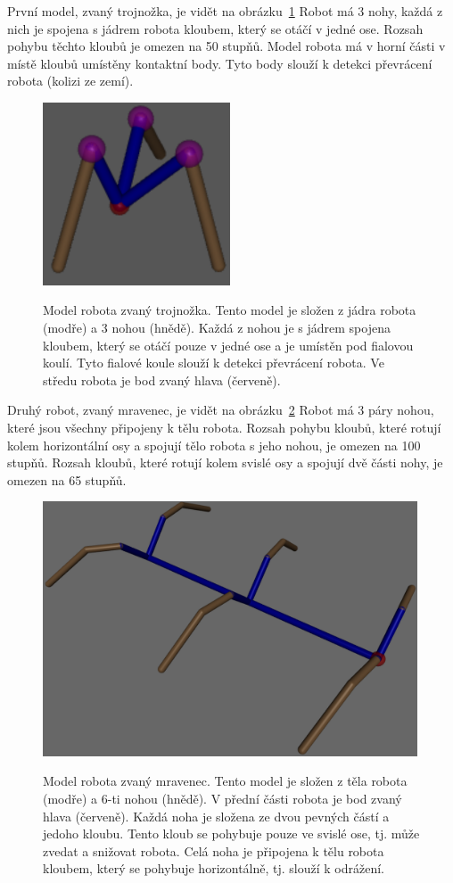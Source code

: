 První model, zvaný trojnožka, je vidět na obrázku~\ref{fig:trojnozka}
Robot má 3 nohy, každá z nich je spojena s jádrem robota kloubem, který se otáčí v jedné ose.
Rozsah pohybu těchto kloubů je omezen na 50 stupňů.
Model robota má v horní části v místě kloubů umístěny kontaktní body.
Tyto body slouží k detekci převrácení robota (kolizi ze zemí).

\begin{figure}[h]
    \centering
    {\includegraphics[width=15em]{obrazky/trojnozka_detail.png}}
    \caption{
    Model robota zvaný trojnožka.
    Tento model je složen z jádra robota (modře) a 3 nohou (hnědě).
    Každá z nohou je s jádrem spojena kloubem, který se otáčí pouze v jedné ose a je umístěn pod fialovou koulí.
    Tyto fialové koule slouží k detekci převrácení robota.
    Ve středu robota je bod zvaný hlava (červeně).
    }
    \label{fig:trojnozka}
\end{figure}


Druhý robot, zvaný mravenec, je vidět na obrázku~\ref{fig:mravenec}
Robot má 3 páry nohou, které jsou všechny připojeny k tělu robota.
Rozsah pohybu kloubů, které rotují kolem horizontální osy a spojují tělo robota s jeho nohou, je omezen na 100 stupňů.
Rozsah kloubů, které rotují kolem svislé osy a spojují dvě části nohy, je omezen na 65 stupňů.


\begin{figure}[h]
    \centering
    {\includegraphics[width=30em]{obrazky/mravenec_detail.png}}
    \caption{
    Model robota zvaný mravenec.
    Tento model je složen z těla robota (modře) a 6-ti nohou (hnědě).
    V přední části robota je bod zvaný hlava (červeně).
    Každá noha je složena ze dvou pevných částí a jedoho kloubu.
    Tento kloub se pohybuje pouze ve svislé ose, tj. může zvedat a snižovat robota.
    Celá noha je připojena k tělu robota kloubem, který se pohybuje horizontálně, tj. slouží k odrážení.
    }
    \label{fig:mravenec}
\end{figure}

